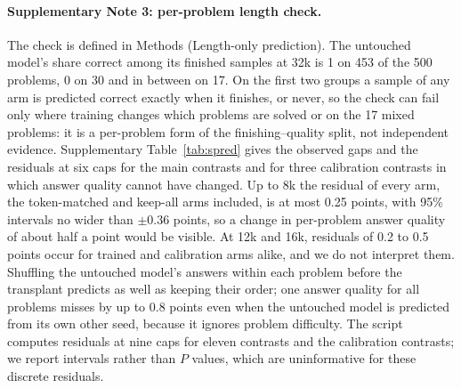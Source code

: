 \documentclass[10pt]{article}
\begin{document}
\paragraph{Supplementary Note 3: per-problem length check.} The check is defined in Methods (Length-only prediction). The untouched model's share correct among its finished samples at 32k is 1 on 453 of the 500 problems, 0 on 30 and in between on 17. On the first two groups a sample of any arm is predicted correct exactly when it finishes, or never, so the check can fail only where training changes which problems are solved or on the 17 mixed problems: it is a per-problem form of the finishing--quality split, not independent evidence. Supplementary Table~\ref{tab:spred} gives the observed gaps and the residuals at six caps for the main contrasts and for three calibration contrasts in which answer quality cannot have changed. Up to 8k the residual of every arm, the token-matched and keep-all arms included, is at most 0.25 points, with 95\% intervals no wider than $\pm0.36$ points, so a change in per-problem answer quality of about half a point would be visible. At 12k and 16k, residuals of 0.2 to 0.5 points occur for trained and calibration arms alike, and we do not interpret them. Shuffling the untouched model's answers within each problem before the transplant predicts as well as keeping their order; one answer quality for all problems misses by up to 0.8 points even when the untouched model is predicted from its own other seed, because it ignores problem difficulty. The script computes residuals at nine caps for eleven contrasts and the calibration contrasts; we report intervals rather than $P$ values, which are uninformative for these discrete residuals.
\end{document}
